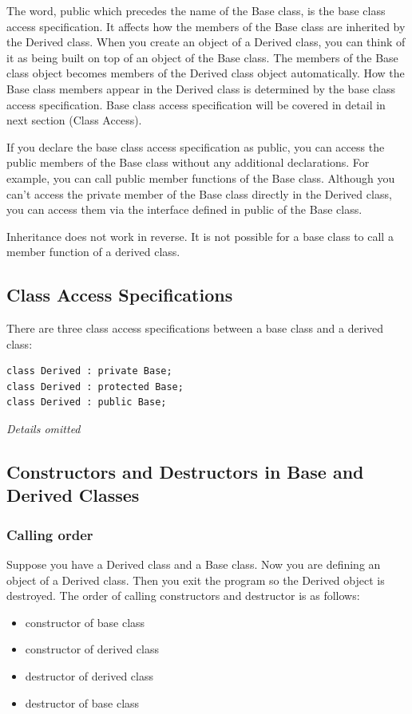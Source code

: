 \documentclass[11pt]{book}
\begin{document}
The word, public which precedes the name of the Base class, is the base class access specification. It affects how the members of the Base class are inherited by the Derived class. When you create an object of a Derived class, you can think of it as being built on top of an object of the Base class. The members of the Base class object becomes members of the Derived class object automatically. How the Base class members appear in the Derived class is determined by the base class access specification. Base class access specification will be covered in detail in next section (Class Access).

If you declare the base class access specification as public, you can access the public members of the Base class without any additional declarations. For example, you can call  public member functions of the Base class. Although you can't access the private member of the Base class directly in the Derived class, you can access them via the interface defined in public of the Base class.

Inheritance does not work in reverse. It is not possible for a base class to call a member function of a derived class.

\subsection{Class Access Specifications}
\label{sec:orga1c78a1}
There are three class access specifications between a base class and a derived class:
\begin{verbatim}
class Derived : private Base;
class Derived : protected Base;
class Derived : public Base;
\end{verbatim}

\emph{Details omitted}

\subsection{Constructors and Destructors in Base and Derived Classes}
\label{sec:org28ae43e}
\subsubsection{Calling order}
\label{sec:org2bb215f}
Suppose you have a Derived class and a Base class. Now you are defining an object of a Derived class. Then you exit the program so the Derived object is destroyed. The order of calling constructors and destructor is as follows:
\begin{itemize}
\item constructor of base class
\item constructor of derived class
\item destructor of derived class
\item destructor of base class
\end{itemize}
\end{document}
